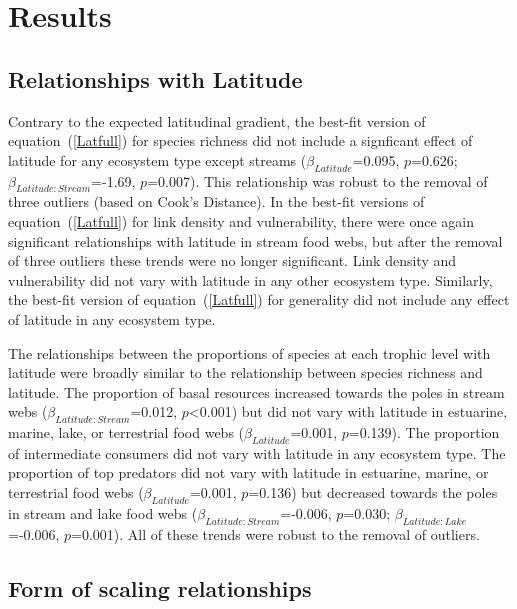 \documentclass[12pt]{article}
\begin{document}
\section*{Results}

\subsection*{Relationships with Latitude}

  Contrary to the expected latitudinal gradient, the best-fit version of
  equation~(\ref{Latfull}) for species richness did not include a signficant effect of latitude for any ecosystem type except streams
  ($\beta_{Latitude}$=0.095, $p$=0.626; $\beta_{Latitude:Stream}$=-1.69, $p$=0.007).  This
  relationship was robust to the removal of three outliers (based on Cook's Distance). In the best-fit versions of
  equation~(\ref{Latfull}) for link density and vulnerability, there were once again
  significant relationships with latitude in stream food webs, but after the removal of three outliers these trends
  were no longer significant. Link density and vulnerability did not vary with latitude in any other ecosystem type.
  Similarly, the best-fit version of equation~(\ref{Latfull}) for generality did not include any effect of
  latitude in any ecosystem type. 


  The relationships between the proportions of species at each trophic level with latitude were broadly similar
  to the relationship between species richness and latitude. 
  The proportion of basal resources increased towards the poles in stream webs ($\beta_{Latitude:Stream}$=0.012, $p$\textless0.001) 
  but did not vary with latitude in estuarine, marine, lake, or terrestrial 
  food webs ($\beta_{Latitude}$=0.001, $p$=0.139).
  The proportion of intermediate consumers did not vary with latitude in any ecosystem type.
  The proportion of top predators did not vary with latitude in 
  estuarine, marine, or terrestrial food webs ($\beta_{Latitude}$=0.001, $p$=0.136) but decreased towards the poles in stream and lake food 
  webs ($\beta_{Latitude:Stream}$=-0.006, $p$=0.030; 
  $\beta_{Latitude:Lake}$=-0.006, $p$=0.001). 
  All of these trends were robust to the removal of outliers.


\subsection*{Form of scaling relationships}
\end{document}
